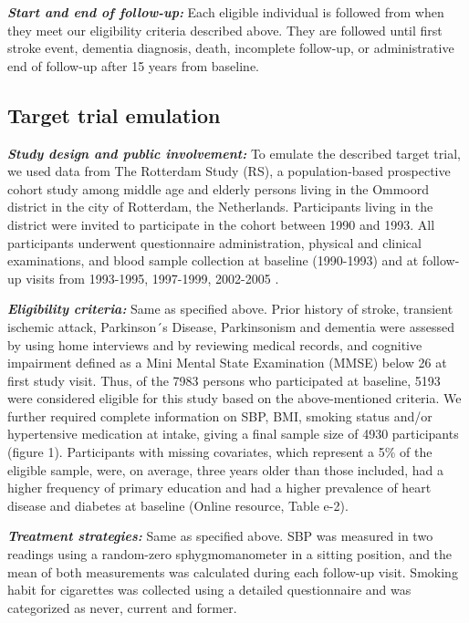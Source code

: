 \documentclass[
]{book}
\begin{document}
\textbf{\emph{Start and end of follow-up:}} Each eligible individual is followed from when they meet our eligibility criteria described above. They are followed until first stroke event, dementia diagnosis, death, incomplete follow-up, or administrative end of follow-up after 15 years from baseline.

\hypertarget{target-trial-emulation}{%
\subsection{Target trial emulation}\label{target-trial-emulation}}

\textbf{\emph{Study design and public involvement:}} To emulate the described target trial, we used data from The Rotterdam Study (RS), a population-based prospective cohort study among middle age and elderly persons living in the Ommoord district in the city of Rotterdam, the Netherlands. Participants living in the district were invited to participate in the cohort between 1990 and 1993. All participants underwent questionnaire administration, physical and clinical examinations, and blood sample collection at baseline (1990-1993) and at follow-up visits from 1993-1995, 1997-1999, 2002-2005 \autocite{ikram2017}.

\textbf{\emph{Eligibility criteria:}} Same as specified above. Prior history of stroke, transient ischemic attack, Parkinson´s Disease, Parkinsonism and dementia were assessed by using home interviews and by reviewing medical records, and cognitive impairment defined as a Mini Mental State Examination (MMSE) below 26 at first study visit. Thus, of the 7983 persons who participated at baseline, 5193 were considered eligible for this study based on the above-mentioned criteria. We further required complete information on SBP, BMI, smoking status and/or hypertensive medication at intake, giving a final sample size of 4930 participants (figure 1). Participants with missing covariates, which represent a 5\% of the eligible sample, were, on average, three years older than those included, had a higher frequency of primary education and had a higher prevalence of heart disease and diabetes at baseline (Online resource, Table e-2).

\textbf{\emph{Treatment strategies:}} Same as specified above. SBP was measured in two readings using a random-zero sphygmomanometer in a sitting position, and the mean of both measurements was calculated during each follow-up visit. Smoking habit for cigarettes was collected using a detailed questionnaire and was categorized as never, current and former.
\end{document}
